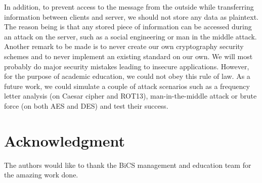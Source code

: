 In addition, to prevent access to the message from the outside while transferring information between clients and server, we should not store any data as plaintext. The reason being is that any stored piece of information can be accessed during an attack on the server, such as a social engineering or man in the middle attack. Another remark to be made is to never create our own cryptography security schemes and to never implement an existing standard on our own. We will most probably do major security mistakes leading to insecure applications. However, for the purpose of academic education, we could not obey this rule of law. 
As a future work, we could simulate a couple of attack scenarios such as a frequency letter analysis (on Caesar cipher and ROT13), man-in-the-middle attack or brute force (on both AES and DES) and test their success. 


\section*{Acknowledgment}
The authors would like to thank the BiCS management and education team for the amazing work done.
